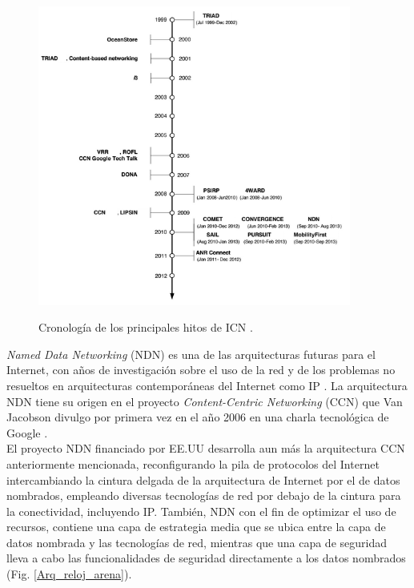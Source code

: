 \documentclass[12pt]{ociamthesis}  %
\begin{document}
	\begin{figure}[!htb]
		\centering
		\includegraphics[width=10.3cm]{Imagenes/Linea_Temporal_ICN_limpia.png}\\
		\caption{Cronología de los principales hitos de ICN \cite{xylomenos2014survey}.}
		\label{fig:mesh1}
	\end{figure}
	
\textit{Named Data Networking} (NDN) es una de las arquitecturas futuras para el Internet, con años de investigación sobre el uso de la red y de los problemas no resueltos en arquitecturas contemporáneas del Internet como IP \cite{nsf10528}\cite{nsf13538}. La arquitectura NDN tiene su origen en el proyecto \textit{Content-Centric Networking} (CCN) que Van Jacobson divulgo por primera vez en el año 2006 en una charla tecnológica de Google \cite{jacobson2006new}.\\

El proyecto NDN financiado por EE.UU desarrolla aun más la arquitectura CCN anteriormente mencionada, reconfigurando la pila de protocolos del Internet intercambiando la cintura delgada de la arquitectura de Internet por el de datos nombrados, empleando diversas tecnologías de red por debajo de la cintura para la conectividad, incluyendo IP. También, NDN con el fin de optimizar el uso de recursos, contiene una capa de estrategia media que se ubica entre la capa de datos nombrada y las tecnologías de red, mientras que una capa de seguridad lleva a cabo las funcionalidades de seguridad directamente a los datos nombrados \cite{xylomenos2014survey}(Fig. \ref{Arq_reloj_arena}).\\
\end{document}

